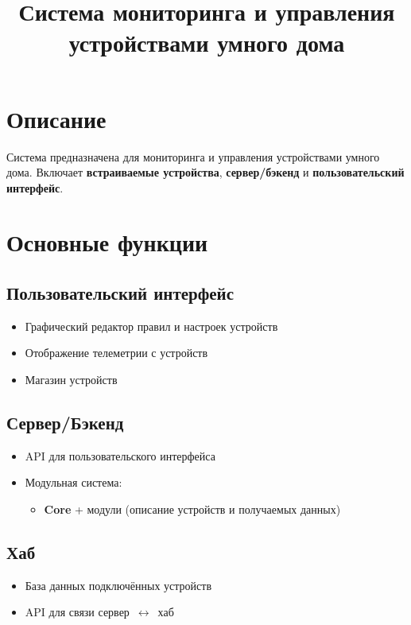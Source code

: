 \documentclass[a4paper,12pt]{article}
\title{Система мониторинга и управления устройствами умного дома}
\date{}
\begin{document}
\maketitle

\section*{Описание}
Система предназначена для мониторинга и управления устройствами умного дома.
Включает \textbf{встраиваемые устройства}, \textbf{сервер/бэкенд} и \textbf{пользовательский интерфейс}.

\section*{Основные функции}

\subsection*{Пользовательский интерфейс}
\begin{itemize}[leftmargin=1.5em]
  \item Графический редактор правил и настроек устройств
  \item Отображение телеметрии с устройств
  \item Магазин устройств
\end{itemize}

\subsection*{Сервер/Бэкенд}
\begin{itemize}[leftmargin=1.5em]
  \item API для пользовательского интерфейса
  \item Модульная система:
        \begin{itemize}
          \item \textbf{Core} + модули (описание устройств и получаемых данных)
        \end{itemize}
\end{itemize}

\subsection*{Хаб}
\begin{itemize}[leftmargin=1.5em]
  \item База данных подключённых устройств
  \item API для связи сервер~$\leftrightarrow$~хаб
\end{itemize}
\end{document}
